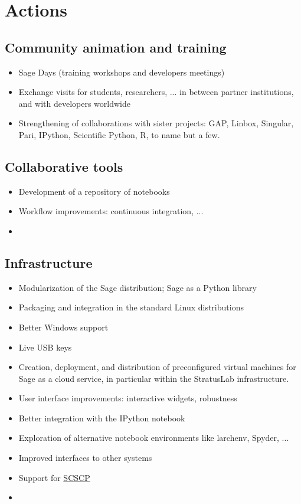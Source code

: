 \section{Actions}

\subsection{Community animation and training}

\begin{itemize}
\item Sage Days (training workshops and developers meetings)
\item Exchange visits for students, researchers, ... in between
  partner institutions, and with developers worldwide
\item Strengthening of collaborations with sister projects: GAP,
  Linbox, Singular, Pari, IPython, Scientific Python, R, to name but a
  few.
\end{itemize}

\subsection{Collaborative tools}

\begin{itemize}
\item Development of a repository of notebooks
\item Workflow improvements: continuous integration, ...
\item {}
\end{itemize}

\subsection{Infrastructure}

\begin{itemize}
\item Modularization of the Sage distribution; Sage as a Python library
\item Packaging and integration in the standard Linux distributions
\item Better Windows support
\item Live USB keys
\item Creation, deployment, and distribution of preconfigured virtual
  machines for Sage as a cloud service, in particular within the
  StratusLab infrastructure.
\item User interface improvements: interactive widgets, robustness
\item Better integration with the IPython notebook
\item Exploration of alternative notebook environments like larchenv,
  Spyder, ...
\item Improved interfaces to other systems
\item Support for \href{http://www.symbolic-computing.org/}{SCSCP}
\item {}
\end{itemize}

